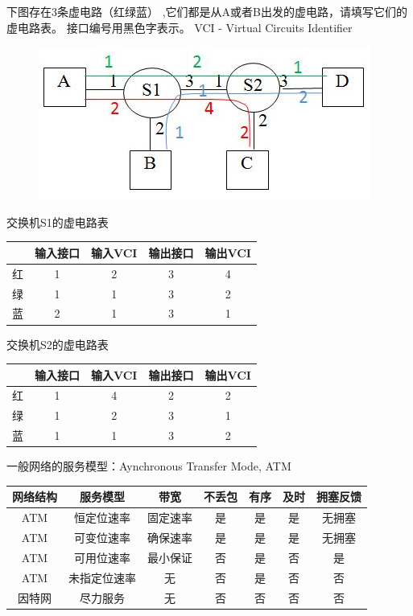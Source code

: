 \begin{example}
	下图存在3条虚电路（红绿蓝） ,它们都是从A或者B出发的虚电路，请填写它们的虚电路表。
	接口编号用黑色字表示。 VCI - Virtual Circuits Identifier
	\begin{figure}[H]
		\centering
		\includegraphics[width=0.4\linewidth]{fig/virtual_circuit.png}
	\end{figure}
\end{example}
\begin{analysis}
交换机S1的虚电路表
\begin{center}
\begin{tabular}{ccccc}\hline
 & 输入接口 & 输入VCI & 输出接口 & 输出VCI\\\hline
红 & 1 & 2 & 3 & 4\\
绿 & 1 & 1 & 3 & 2\\
蓝 & 2 & 1 & 3 & 1\\\hline
\end{tabular}
\end{center}
交换机S2的虚电路表
\begin{center}
\begin{tabular}{ccccc}\hline
 & 输入接口 & 输入VCI & 输出接口 & 输出VCI\\\hline
红 & 1 & 4 & 2 & 2\\
绿 & 1 & 2 & 3 & 1\\
蓝 & 1 & 1 & 3 & 2\\\hline
\end{tabular}
\end{center}
\end{analysis}

一般网络的服务模型：Aynchronous Transfer Mode, ATM
\begin{center}
\begin{tabular}{|c|c|c|c|c|c|c|}\hline
网络结构 & 服务模型 & 带宽 & 不丢包 & 有序 & 及时 & 拥塞反馈\\\hline
ATM & 恒定位速率 & 固定速率 & 是 & 是 & 是 & 无拥塞\\\hline
ATM & 可变位速率 & 确保速率 & 是 & 是 & 是 & 无拥塞\\\hline
ATM & 可用位速率 & 最小保证 & 否 & 是 & 否 & 是\\\hline
ATM & 未指定位速率 & 无 & 否 & 是 & 否 & 否\\\hline
因特网 & 尽力服务 & 无 & 否 & 否 & 否 & 否\\\hline
\end{tabular}
\end{center}

